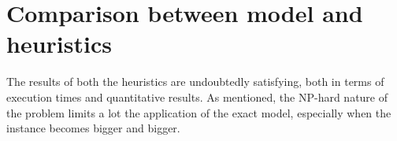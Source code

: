 \documentclass{article}
\begin{document}

\section{Comparison between model and heuristics }
The results of both the heuristics are undoubtedly satisfying, both in terms of execution times and quantitative results. 
As mentioned, the NP-hard nature of the problem limits a lot the application of the exact model, especially when the instance becomes bigger and bigger. \\
\end{document}
